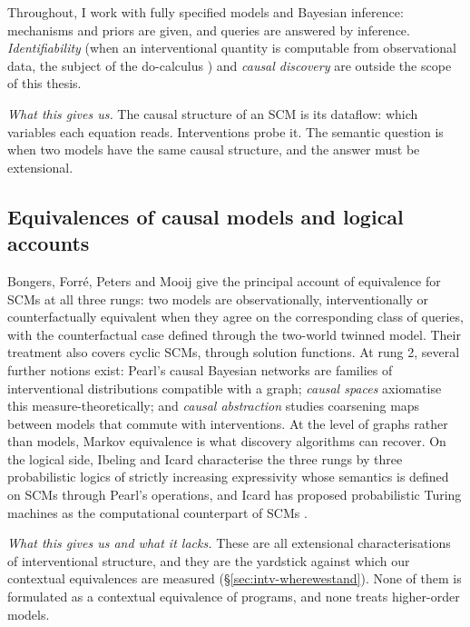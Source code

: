 Throughout, I work with fully specified models and Bayesian inference: mechanisms and priors are given, and queries are answered by inference. \emph{Identifiability} (when an interventional quantity is computable from observational data, the subject of the do-calculus \cite{JMLR:v9:shpitser08a,shpitser2012counterfactualstested}) and \emph{causal discovery} \cite{spirtes2000causation,peters_janzing_schoelkopf_2017_book} are outside the scope of this thesis.

\emph{What this gives us.} The causal structure of an SCM is its dataflow: which variables each equation reads. Interventions probe it. The semantic question is when two models have the same causal structure, and the answer must be extensional.

\subsection{Equivalences of causal models and logical accounts}

Bongers, Forré, Peters and Mooij \cite{Bongers_2021} give the principal account of equivalence for SCMs at all three rungs: two models are observationally, interventionally or counterfactually equivalent when they agree on the corresponding class of queries, with the counterfactual case defined through the two-world twinned model. Their treatment also covers cyclic SCMs, through solution functions. At rung 2, several further notions exist: Pearl's causal Bayesian networks are families of interventional distributions compatible with a graph; \emph{causal spaces} \cite{park2024measuretheoreticaxiomatisationcausality,buchholz2024products} axiomatise this measure-theoretically; and \emph{causal abstraction} \cite{rubenstein2017consistency,beckers2019abstracting,rischel2021abstraction,lorenztull2026abstraction,englberger2025causalabstractionscategoricallyunified} studies coarsening maps between models that commute with interventions. At the level of graphs rather than models, Markov equivalence \cite{verma1990equivalence} is what discovery algorithms can recover. On the logical side, Ibeling and Icard \cite{ibeling2020hierarchy} characterise the three rungs by three probabilistic logics of strictly increasing expressivity whose semantics is defined on SCMs through Pearl's operations, and Icard has proposed probabilistic Turing machines as the computational counterpart of SCMs \cite{icard2017programs,ibeling2019openuniverse}.

\emph{What this gives us and what it lacks.} These are all extensional characterisations of interventional structure, and they are the yardstick against which our contextual equivalences are measured (\S\ref{sec:intv-wherewestand}). None of them is formulated as a contextual equivalence of programs, and none treats higher-order models.


